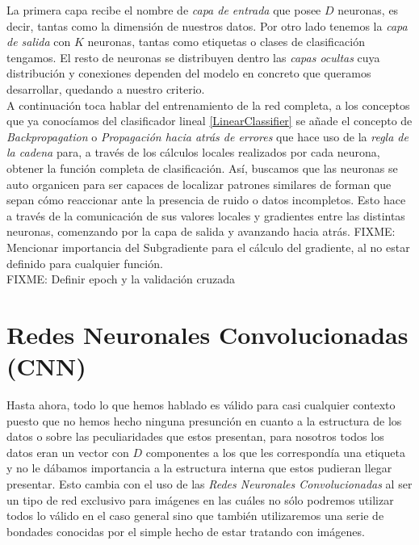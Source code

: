 La primera capa recibe el nombre de \emph{capa de entrada} que posee $D$ neuronas, es decir, tantas como la dimensión de nuestros datos. Por otro lado tenemos la \emph{capa de salida} con $K$ neuronas, tantas como etiquetas o clases de clasificación tengamos. El resto de neuronas se distribuyen dentro las \emph{capas ocultas} cuya distribución y conexiones dependen del modelo en concreto que queramos desarrollar, quedando a nuestro criterio.\\

A continuación toca hablar del entrenamiento de la red completa, a los conceptos que ya conocíamos del clasificador lineal \ref{LinearClassifier} se añade el concepto de \emph{Backpropagation} o \emph{Propagación hacia atrás de errores} que hace uso de la \emph{regla de la cadena} para, a través de los cálculos locales realizados por cada neurona, obtener la función completa de clasificación. Así, buscamos que las neuronas se auto organicen para ser capaces de localizar patrones similares de forman que sepan cómo reaccionar ante la presencia de ruido o datos incompletos. Esto hace a través de la comunicación de sus valores locales y gradientes entre las distintas neuronas, comenzando por la capa de salida y avanzando hacia atrás. FIXME: Mencionar importancia del Subgradiente para el cálculo del gradiente, al no estar definido para cualquier función. \\

FIXME: Definir epoch y la validación cruzada

\chapter{Redes Neuronales Convolucionadas (CNN)}

Hasta ahora, todo lo que hemos hablado es válido para casi cualquier contexto puesto que no hemos hecho ninguna presunción en cuanto a la estructura de los datos o sobre las peculiaridades que estos presentan, para nosotros todos los datos eran un vector con $D$ componentes a los que les correspondía una etiqueta y no le dábamos importancia a la estructura interna que estos pudieran llegar presentar. Esto cambia con el uso de las \emph{Redes Neuronales Convolucionadas} al ser un tipo de red exclusivo para imágenes en las cuáles no sólo podremos utilizar todos lo válido en el caso general sino que también utilizaremos una serie de bondades conocidas por el simple hecho de estar tratando con imágenes.\\

